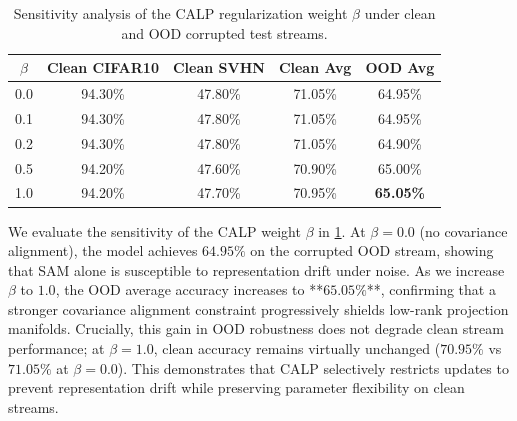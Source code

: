 \documentclass{article}
\begin{document}
\begin{table}[h]
\caption{Sensitivity analysis of the CALP regularization weight $\beta$ under clean and OOD corrupted test streams.}
\label{tab:ablation}
\vskip 0.1in
\begin{center}
\begin{small}
\begin{sc}
\setlength{\tabcolsep}{2pt}
\begin{tabular}{ccccc}
\toprule
$\beta$ & Clean CIFAR10 & Clean SVHN & Clean Avg & OOD Avg \\
\midrule
0.0 & 94.30\% & 47.80\% & 71.05\% & 64.95\% \\
0.1 & 94.30\% & 47.80\% & 71.05\% & 64.95\% \\
0.2 & 94.30\% & 47.80\% & 71.05\% & 64.90\% \\
0.5 & 94.20\% & 47.60\% & 70.90\% & 65.00\% \\
1.0 & 94.20\% & 47.70\% & 70.95\% & \textbf{65.05\%} \\
\bottomrule
\end{tabular}
\end{sc}
\end{small}
\end{center}
\vskip -0.1in
\end{table}

We evaluate the sensitivity of the CALP weight $\beta$ in \cref{tab:ablation}. At $\beta=0.0$ (no covariance alignment), the model achieves $64.95\%$ on the corrupted OOD stream, showing that SAM alone is susceptible to representation drift under noise. As we increase $\beta$ to $1.0$, the OOD average accuracy increases to **$65.05\%$**, confirming that a stronger covariance alignment constraint progressively shields low-rank projection manifolds. Crucially, this gain in OOD robustness does not degrade clean stream performance; at $\beta=1.0$, clean accuracy remains virtually unchanged ($70.95\%$ vs $71.05\%$ at $\beta=0.0$). This demonstrates that CALP selectively restricts updates to prevent representation drift while preserving parameter flexibility on clean streams.
\end{document}
